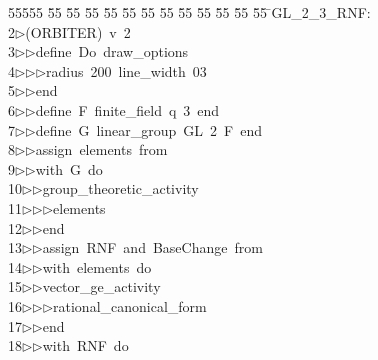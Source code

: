 %
%
\begin{tabbing}
55555 \= 55 \= 55 \= 55 \= 55 \= 55 \= 55 \= 55 \= 55 \= 55 \= 55 \= 55 \= 55 \= \>GL\_2\_3\_RNF:\\[0pt]
2\>$\triangleright$\>(ORBITER)\ v\ 2\ \\[0pt]
3\>$\triangleright$\>$\triangleright$\>define\ Do\ draw\_options\ \\[0pt]
4\>$\triangleright$\>$\triangleright$\>$\triangleright$\>radius\ 200\ line\_width\ 03\ \\[0pt]
5\>$\triangleright$\>$\triangleright$\>end\ \\[0pt]
6\>$\triangleright$\>$\triangleright$\>define\ F\ finite\_field\ q\ 3\ end\ \\[0pt]
7\>$\triangleright$\>$\triangleright$\>define\ G\ linear\_group\ GL\ 2\ F\ end\ \\[0pt]
8\>$\triangleright$\>$\triangleright$\>assign\ elements\ from\ \\[0pt]
9\>$\triangleright$\>$\triangleright$\>with\ G\ do\ \\[0pt]
10\>$\triangleright$\>$\triangleright$\>group\_theoretic\_activity\ \\[0pt]
11\>$\triangleright$\>$\triangleright$\>$\triangleright$\>elements\ \\[0pt]
12\>$\triangleright$\>$\triangleright$\>end\ \\[0pt]
13\>$\triangleright$\>$\triangleright$\>assign\ RNF\ and\ BaseChange\ from\ \\[0pt]
14\>$\triangleright$\>$\triangleright$\>with\ elements\ do\ \\[0pt]
15\>$\triangleright$\>$\triangleright$\>vector\_ge\_activity\ \\[0pt]
16\>$\triangleright$\>$\triangleright$\>$\triangleright$\>rational\_canonical\_form\ \\[0pt]
17\>$\triangleright$\>$\triangleright$\>end\ \\[0pt]
18\>$\triangleright$\>$\triangleright$\>with\ RNF\ do\ \\[0pt]

\end{tabbing}
